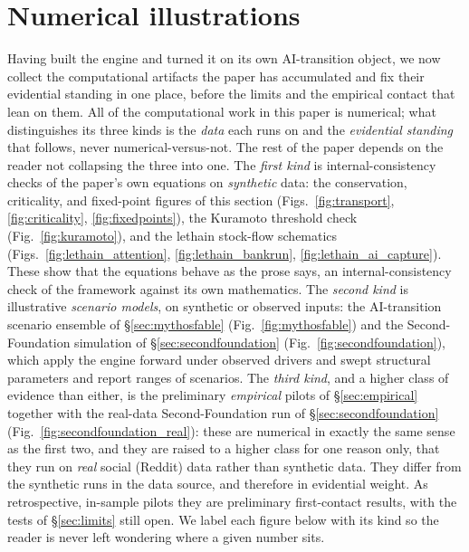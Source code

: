 \documentclass[11pt]{article}
\begin{document}
\section{Numerical illustrations}
\label{sec:figures}

Having built the engine and turned it on its own AI-transition object, we now collect the computational artifacts the paper has accumulated and fix their evidential standing in one place, before the limits and the empirical contact that lean on them. All of the computational work in this paper is numerical; what distinguishes its three kinds is the \emph{data} each runs on and the \emph{evidential standing} that follows, never numerical-versus-not. The rest of the paper depends on the reader not collapsing the three into one. The \emph{first kind} is internal-consistency checks of the paper's own equations on \emph{synthetic} data: the conservation, criticality, and fixed-point figures of this section (Figs.~\ref{fig:transport}, \ref{fig:criticality}, \ref{fig:fixedpoints}), the Kuramoto threshold check (Fig.~\ref{fig:kuramoto}), and the lethain stock-flow schematics (Figs.~\ref{fig:lethain_attention}, \ref{fig:lethain_bankrun}, \ref{fig:lethain_ai_capture}). These show that the equations behave as the prose says, an internal-consistency check of the framework against its own mathematics. The \emph{second kind} is illustrative \emph{scenario models}, on synthetic or observed inputs: the AI-transition scenario ensemble of \S\ref{sec:mythosfable} (Fig.~\ref{fig:mythosfable}) and the Second-Foundation simulation of \S\ref{sec:secondfoundation} (Fig.~\ref{fig:secondfoundation}), which apply the engine forward under observed drivers and swept structural parameters and report ranges of scenarios. The \emph{third kind}, and a higher class of evidence than either, is the preliminary \emph{empirical} pilots of \S\ref{sec:empirical} together with the real-data Second-Foundation run of \S\ref{sec:secondfoundation} (Fig.~\ref{fig:secondfoundation_real}): these are numerical in exactly the same sense as the first two, and they are raised to a higher class for one reason only, that they run on \emph{real} social (Reddit) data rather than synthetic data. They differ from the synthetic runs in the data source, and therefore in evidential weight. As retrospective, in-sample pilots they are preliminary first-contact results, with the tests of \S\ref{sec:limits} still open. We label each figure below with its kind so the reader is never left wondering where a given number sits.
\end{document}
